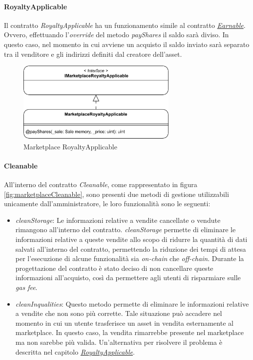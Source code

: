 \paragraph{RoyaltyApplicable}
\label{sec:marketplace-royalty-applicable}

Il contratto \textit{RoyaltyApplicable} ha un funzionamento simile al contratto \hyperref[sec:marketplace-earnable]{\textit{Earnable}}. Ovvero, effettuando l'\textit{override} del metodo \textit{payShares} il saldo sarà diviso. In questo caso,
nel momento in cui avviene un acquisto il saldo inviato sarà separato tra il venditore e gli indirizzi definiti dal creatore dell'asset.

\begin{figure}[H]
    \centering
    \includegraphics[width=0.7\textwidth]{images/blockchainContracts/MarketplaceRoyaltyApplicable.png}
    \caption{Marketplace RoyaltyApplicable}
    \label{fig:marketplaceRoyaltyApplicable}
\end{figure}


\paragraph{Cleanable}

All'interno del contratto \textit{Cleanable}, come rappresentato in figura \ref{fig:marketplaceCleanable}, sono presenti due metodi di gestione utilizzabili unicamente dall'amministratore, le loro funzionalità sono le seguenti:

\begin{itemize}
    \item \textit{cleanStorage}: Le informazioni relative a vendite cancellate o vendute rimangono all'interno del contratto. \textit{cleanStorage} permette di eliminare le informazioni relative a queste vendite allo scopo di ridurre la quantità di dati salvati all'interno del contratto, permettendo la riduzione dei tempi di attesa per l'esecuzione di alcune funzionalità sia \textit{on-chain} che \textit{off-chain}. Durante la progettazione del contratto è stato deciso di non cancellare queste informazioni all'acquisto, così da permettere agli utenti di risparmiare sulle \textit{gas fee}.
    \item \textit{cleanInqualities}: Questo metodo permette di eliminare le informazioni relative a vendite che non sono più corrette. Tale situazione può accadere nel momento in cui un utente trasferisce un asset in vendita esternamente al marketplace. In questo caso, la vendita rimarrebbe presente nel marketplace ma non sarebbe più valida. Un'alternativa per risolvere il problema è descritta nel capitolo \hyperref[sec:marketplace-royalty-applicable]{\textit{RoyaltyApplicable}}.
\end{itemize}

